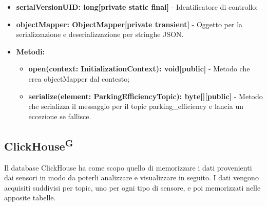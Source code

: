 \documentclass[8pt]{article}
\newcommand{\glossterm}[1]{#1\textsuperscript{G}} %
\begin{document}
\begin{itemize}
\begin{itemize}
        \begin{itemize}
            \item \textbf{serialVersionUID: long[private static final]} - Identificatore di controllo;
            \item \textbf{objectMapper: ObjectMapper[private transient]} - Oggetto per la serializzazione e deserializzazione per stringhe JSON.
        \end{itemize}
    \end{itemize}
    \begin{itemize}
        \item \textbf{Metodi:}
        \begin{itemize}
            \item \textbf{open(context: InitializationContext): void[public]} - Metodo che crea objectMapper dal contesto;
            \item \textbf{serialize(element: ParkingEfficiencyTopic): byte[][public]} - Metodo che serializza il messaggio per il topic parking\_efficiency e lancia un eccezione se fallisce.
        \end{itemize}
    \end{itemize}
\end{itemize}
\clearpage
\subsection{\glossterm{ClickHouse}}
Il database ClickHouse ha come scopo quello di memorizzare i dati provenienti dai sensori in modo da poterli analizzare e visualizzare in seguito. I dati vengono acquisiti suddivisi per topic, uno per ogni tipo di sensore, e poi memorizzati nelle apposite tabelle.
\end{document}
